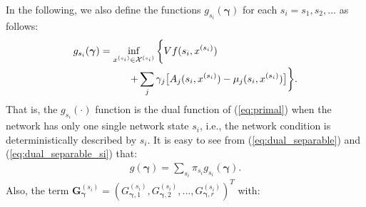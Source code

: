 \documentclass[journal]{IEEEtran}
\newcommand{\bv}[1]{{\boldsymbol{#1} }}
\newcommand{\script}[1]{{{\cal{#1} }}}
\begin{document}
In the following, we also define the functions $g_{s_i}(\bv{\gamma})$ for each $s_i=s_1, s_2, ...$ as follows:
\begin{eqnarray}
g_{s_i}(\bv{\gamma})=\inf_{x^{(s_i)}\in \script{X}^{(s_i)}} \bigg\{Vf(s_i, x^{(s_i)})\label{eq:dual_separable_si}\qquad\qquad\qquad\qquad\\
+\sum_j\gamma_j\big[A_j(s_i, x^{(s_i)})- \mu_j(s_i, x^{(s_i)})\big]\bigg\}.\nonumber
\end{eqnarray}
That is, the $g_{s_i}(\cdot)$ function is the dual function of (\ref{eq:primal}) when the network has only one single network state $s_i$, i.e., the network condition is deterministically described by $s_i$. It is easy to see from (\ref{eq:dual_separable}) and (\ref{eq:dual_separable_si}) that:
\begin{eqnarray}
g(\bv{\gamma})=\sum_{s_i}\pi_{s_i}g_{s_i}(\bv{\gamma}). \label{eq:dualfunction_sumofsi}
\end{eqnarray} %
Also, the term $\bv{G}^{(s_i)}_{\bv{\gamma}}=(G^{(s_i)}_{\bv{\gamma},1}, G^{(s_i)}_{\bv{\gamma},2}, ..., G^{(s_i)}_{\bv{\gamma},r})^{T}$ with: 
\end{document}
